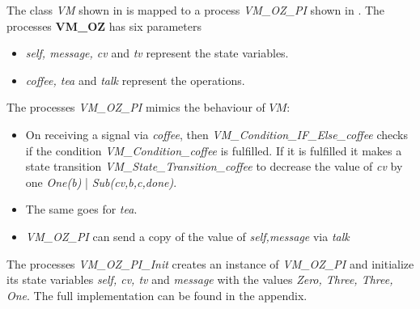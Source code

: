 The class \textit{VM} shown in  is mapped to a \picalc{} process \textit{VM\_OZ\_PI} shown in . The processes \textbf{VM\_OZ} has six parameters
\begin{itemize}
\item \textit{self, message, cv} and \textit{tv} represent the state variables.
\item \textit{coffee, tea} and \textit{talk} represent the operations.
\end{itemize}
The processes \textit{VM\_OZ\_PI} mimics the behaviour of $VM$:
\begin{itemize}
\item On receiving a signal via \textit{coffee}, then \textit{VM\_Condition\_IF\_Else\_coffee} checks if the condition \textit{VM\_Condition\_coffee} is fulfilled. If it is fulfilled it makes a state transition \textit{VM\_State\_Transition\_coffee} to decrease the value of \textit{cv} by one \textit{One(b) }| \textit{Sub(cv,b,c,done)}.
\item The same goes for \textit{tea}.
\item  \textit{VM\_OZ\_PI} can send a copy of the value of  \textit{self,message} via  \textit{talk}
\end{itemize}
The processes \textit{VM\_OZ\_PI\_Init} creates an instance of \textit{VM\_OZ\_PI} and initialize its state variables \textit{self, cv, tv} and \textit{message} with the values \textit{Zero, Three, Three, One}. The full implementation can be found in the appendix.
